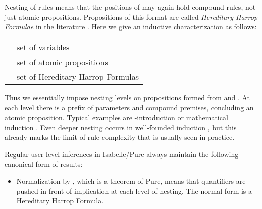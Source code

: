 \begin{isabellebody}
\begin{isamarkuptext}
  Nesting of rules means that the positions of  may
  again hold compound rules, not just atomic propositions.
  Propositions of this format are called \emph{Hereditary Harrop
  Formulae} in the literature \cite{Miller:1991}.  Here we give an
  inductive characterization as follows:

  \medskip
  \begin{tabular}{ll}
  \isa{\isactrlbold x} & set of variables \\
  \isa{\isactrlbold A} & set of atomic propositions \\
  \isa{\isactrlbold H\ \ {\isacharequal}\ \ {\isasymAnd}\isactrlbold x\isactrlsup {\isacharasterisk}{\isachardot}\ \isactrlbold H\isactrlsup {\isacharasterisk}\ {\isasymLongrightarrow}\ \isactrlbold A} & set of Hereditary Harrop Formulas \\
  \end{tabular}
  \medskip

  Thus we essentially impose nesting levels on propositions formed
  from \isa{{\isasymAnd}} and \isa{{\isasymLongrightarrow}}.  At each level there is a prefix
  of parameters and compound premises, concluding an atomic
  proposition.  Typical examples are \isa{{\isasymlongrightarrow}}-introduction  or mathematical induction .  Even deeper nesting occurs in well-founded
  induction , but this
  already marks the limit of rule complexity that is usually seen in
  practice.

  \medskip Regular user-level inferences in Isabelle/Pure always
  maintain the following canonical form of results:

  \begin{itemize}

  \item Normalization by ,
  which is a theorem of Pure, means that quantifiers are pushed in
  front of implication at each level of nesting.  The normal form is a
  Hereditary Harrop Formula.


\end{itemize}
\end{isamarkuptext}
\end{isabellebody}

